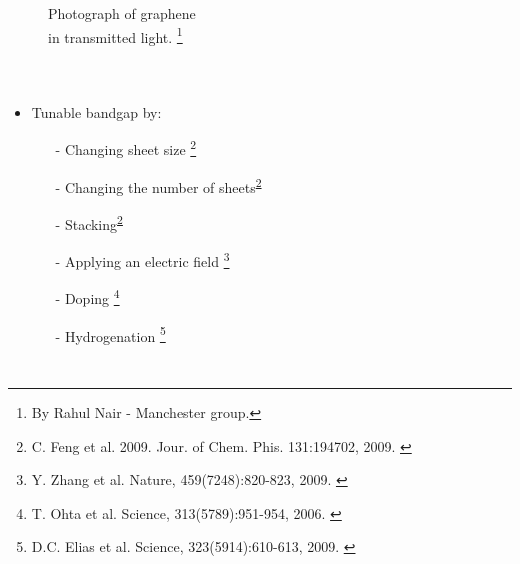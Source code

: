 \documentclass{beamer}
\begin{document}
\begin{frame}
\begin{columns}
\begin{figure}
Photograph of graphene \\
in transmitted light.
\footnote[frame]{\tiny By Rahul Nair - Manchester group.}
\end{figure}
\end{columns}

\hspace{5mm}
\end{frame}


\begin{frame}

\begin{columns}


\begin{itemize}
\item Tunable bandgap by:
\noindent
\begin{itemize}

\item[-] Changing sheet size
\footnote[frame]{\tiny C. Feng et al. 2009. Jour. of Chem. Phis. 131:194702,
2009. \label{ft:fengJCP09}}

\item[-] Changing the number of sheets\textsuperscript{\ref{ft:fengJCP09}} 

\item[-] Stacking\textsuperscript{\ref{ft:fengJCP09}}

\item[-] Applying an electric field
\footnote[frame]{\tiny Y. Zhang et al. Nature, 459(7248):820-823, 2009.
\label{ft:ahangNAT09}}

\item[-] Doping
\footnote[frame]{\tiny T. Ohta et al. Science, 313(5789):951-954, 2006.
\label{ft:ohtaSC06}}

\item[-] Hydrogenation
\footnote[frame]{\tiny D.C. Elias et al. Science, 323(5914):610-613, 2009.
\label{ft:eliasSC09}}

\end{itemize}
\end{itemize}




\end{columns}
\end{frame}
\end{document}
